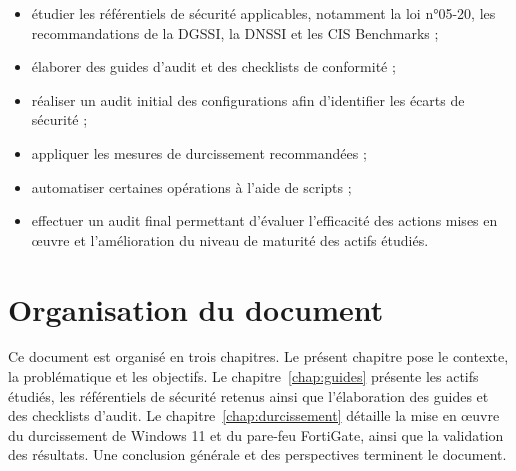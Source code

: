 \begin{itemize}
  \item étudier les référentiels de sécurité applicables, notamment la loi n°05-20, les recommandations de la DGSSI, la DNSSI et les CIS Benchmarks ;
  \item élaborer des guides d'audit et des checklists de conformité ;
  \item réaliser un audit initial des configurations afin d'identifier les écarts de sécurité ;
  \item appliquer les mesures de durcissement recommandées ;
  \item automatiser certaines opérations à l'aide de scripts ;
  \item effectuer un audit final permettant d'évaluer l'efficacité des actions mises en œuvre et l'amélioration du niveau de maturité des actifs étudiés.
\end{itemize}

\section{Organisation du document}

Ce document est organisé en trois chapitres. Le présent chapitre pose le contexte, la problématique et les objectifs. Le chapitre~\ref{chap:guides} présente les actifs étudiés, les référentiels de sécurité retenus ainsi que l'élaboration des guides et des checklists d'audit. Le chapitre~\ref{chap:durcissement} détaille la mise en œuvre du durcissement de Windows 11 et du pare-feu FortiGate, ainsi que la validation des résultats. Une conclusion générale et des perspectives terminent le document.
